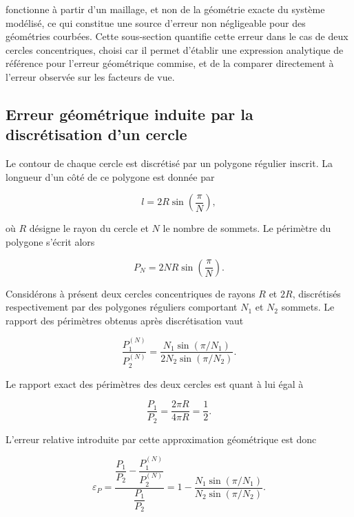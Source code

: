 \ETT fonctionne à partir d'un maillage, et non de la géométrie exacte du système modélisé, ce qui constitue une source d'erreur non négligeable pour des géométries courbées. Cette sous-section quantifie cette erreur dans le cas de deux cercles concentriques, choisi car il permet d'établir une expression analytique de référence pour l'erreur géométrique commise, et de la comparer directement à l'erreur observée sur les facteurs de vue.

\subsection{Erreur géométrique induite par la discrétisation d'un cercle}

Le contour de chaque cercle est discrétisé par un polygone régulier inscrit. La longueur d'un côté de ce polygone est donnée par

\begin{equation}
l = 2R\sin\left(\frac{\pi}{N}\right),
\end{equation}

où $R$ désigne le rayon du cercle et $N$ le nombre de sommets. Le périmètre du polygone s'écrit alors

\begin{equation}
P_N
=
2NR\sin\left(\frac{\pi}{N}\right).
\label{eq:perimetre_poly}
\end{equation}

Considérons à présent deux cercles concentriques de rayons $R$ et $2R$, discrétisés respectivement par des polygones réguliers comportant $N_1$ et $N_2$ sommets. Le rapport des périmètres obtenus après discrétisation vaut

\begin{equation}
\frac{P_1^{(N)}}{P_2^{(N)}}
=
\frac{N_1\sin\left(\pi/N_1\right)}
     {2N_2\sin\left(\pi/N_2\right)}.
\label{eq:ratio_perimetres}
\end{equation}

Le rapport exact des périmètres des deux cercles est quant à lui égal à

\begin{equation}
\frac{P_1}{P_2}
=
\frac{2\pi R}{4\pi R}
=
\frac{1}{2}.
\end{equation}

L'erreur relative introduite par cette approximation géométrique est donc

\begin{equation}
\varepsilon_P
=
\frac{
\dfrac{P_1}{P_2}
-
\dfrac{P_1^{(N)}}{P_2^{(N)}}
}{
\dfrac{P_1}{P_2}
}
=
1-
\frac{N_1\sin\left(\pi/N_1\right)}
     {N_2\sin\left(\pi/N_2\right)}.
\label{eq:err_ratio_perimetre}
\end{equation}

